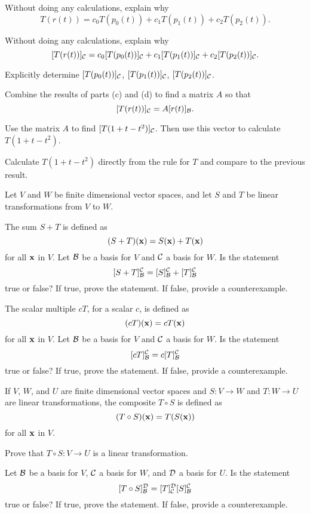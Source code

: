 	\item Without doing any calculations, explain why 
\[T(r(t)) = c_0T(p_0(t)) + c_1 T(p_1(t)) + c_2 T(p_2(t)).\]

	\item Without doing any calculations, explain why 
	\[[T(r(t))]_{\mathcal{C}} = c_0[T(p_0(t))]_{\mathcal{C}} + c_1 [T(p_1(t))]_{\mathcal{C}} + c_2 [T(p_2(t))]_{\mathcal{C}}.\]
	
	
	\item Explicitly determine $[T(p_0(t))]_{\mathcal{C}}$, $[T(p_1(t))]_{\mathcal{C}}$, $[T(p_2(t))]_{\mathcal{C}}$.


	\item Combine the results of parts (c) and (d) to find a matrix $A$ so that 
\[[T(r(t))]_{\mathcal{C}} = A [r(t)]_{\mathcal{B}}.\]

	
	\item Use the matrix $A$ to find $[T(1+t-t^2)]_{\mathcal{C}}$. Then use this vector to calculate $T(1+t-t^2)$. 

	
	\item Calculate $T(1+t-t^2)$ directly from the rule for $T$ and compare to the previous result. 

	
	\ea


\item Let $V$ and $W$ be finite dimensional vector spaces, and let $S$ and $T$ be linear transformations from $V$ to $W$.
\ba
\item The sum $S+T$ is defined as 
\[(S+T)(\mathbf{x}) = S(\mathbf{x}) + T(\mathbf{x})\]
for all $\mathbf{x}$ in $V$.   Let $\mathcal{B}$ be a basis for $V$ and $\mathcal{C}$ a basis for $W$. Is the statement
\[[S+T]_{\mathcal{B}}^{\mathcal{C}} = [S]_{\mathcal{B}}^{\mathcal{C}} + [T]_{\mathcal{B}}^{\mathcal{C}} \]
true or false? If true, prove the statement. If false, provide a counterexample. 

\item The scalar multiple $cT$, for a scalar $c$, is defined as 
\[(cT)(\mathbf{x}) = cT(\mathbf{x})\]
for all $\mathbf{x}$ in $V$.   Let $\mathcal{B}$ be a basis for $V$ and $\mathcal{C}$ a basis for $W$. Is the statement
\[[cT]_{\mathcal{B}}^{\mathcal{C}} = c[T]_{\mathcal{B}}^{\mathcal{C}} \]
true or false? If true, prove the statement. If false, provide a counterexample. 

\ea


\item If $V$, $W$, and $U$ are finite dimensional vector spaces and $S:V \to W$ and $T:W \to U$ are linear transformations, the composite $T \circ S$ is defined as 
\[(T \circ S)(\mathbf{x}) = T(S(\mathbf{x}))\]
for all $\mathbf{x}$ in $V$.   
	\ba
	\item Prove that $T \circ S:V\to U$ is a linear transformation.
	\item Let $\mathcal{B}$ be a basis for $V$, $\mathcal{C}$ a basis for $W$, and $\mathcal{D}$ a basis for $U$. Is the statement
\[[T \circ S]_{\mathcal{B}}^{\mathcal{D}} = [T]_{\mathcal{C}}^{\mathcal{D}}  [S]_{\mathcal{B}}^{\mathcal{C}} \]
true or false? If true, prove the statement. If false, provide a counterexample. 
	\ea

